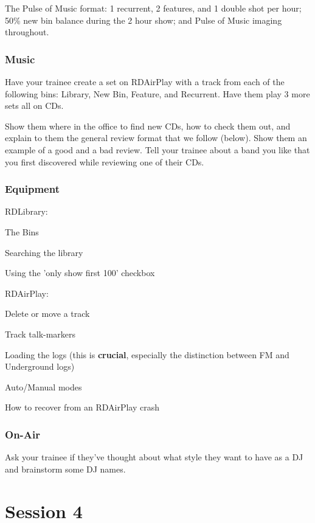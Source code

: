 \documentclass{witrman}
\begin{document}
The Pulse of Music format: 1 recurrent, 2 features, and 1 double shot per hour;
50\% new bin balance during the 2 hour show; and Pulse of Music imaging
throughout.

\subsection{Music}

Have your trainee create a set on RDAirPlay with a track from each of the
following bins: Library, New Bin, Feature, and Recurrent.  Have them play 3 more
sets all on CDs.

Show them where in the office to find new CDs, how to check them out, and
explain to them the general review format that we follow (below).  Show them an
example of a good and a bad review.  Tell your trainee about a band you like
that you first discovered while reviewing one of their CDs.

\subsection{Equipment}

RDLibrary:
\begin{skinnyitemize}
    \item The Bins
    \item Searching the library
    \item Using the 'only show first 100' checkbox
\end{skinnyitemize}

RDAirPlay:
\begin{skinnyitemize}
    \item Delete or move a track
    \item Track talk-markers
    \item Loading the logs (this is \textbf{crucial}, especially the distinction
        between FM and Underground logs)
    \item Auto/Manual modes
    \item How to recover from an RDAirPlay crash
\end{skinnyitemize}

\subsection{On-Air}

Ask your trainee if they've thought about what style they want to have as a DJ
and brainstorm some DJ names.


\chapter{Session 4}
\end{document}
